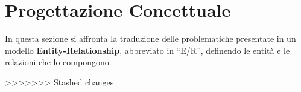 \chapter{Progettazione Concettuale}
In questa sezione si affronta la traduzione delle problematiche presentate in un
modello \textbf{Entity-Relationship}, abbreviato in ``E/R'', definendo le entità
e le relazioni che lo compongono.


>>>>>>> Stashed changes
